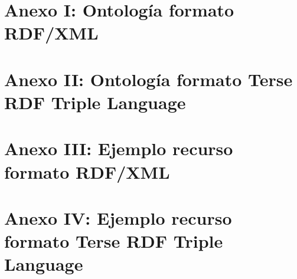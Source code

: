 \chapter*{Anexo I: Ontología formato RDF/XML}

\chapter*{Anexo II: Ontología formato Terse RDF Triple Language}

\chapter*{Anexo III: Ejemplo recurso formato RDF/XML}

\chapter*{Anexo IV: Ejemplo recurso formato Terse RDF Triple Language}

